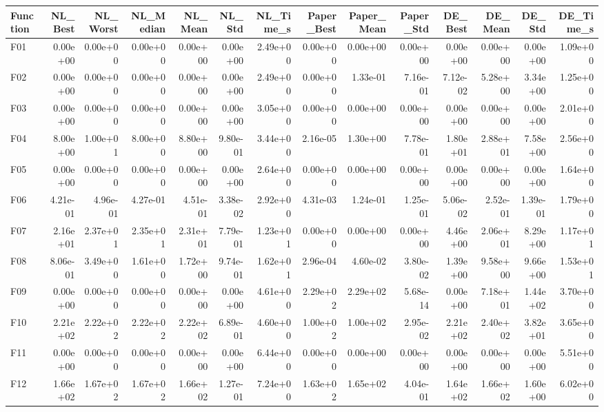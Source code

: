 \begin{tabular}{lrrrrrrrrrrrrr}
\toprule
Function & NL_Best & NL_Worst & NL_Median & NL_Mean & NL_Std & NL_Time_s & Paper_Best & Paper_Mean & Paper_Std & DE_Best & DE_Mean & DE_Std & DE_Time_s \\
\midrule
F01 & 0.00e+00 & 0.00e+00 & 0.00e+00 & 0.00e+00 & 0.00e+00 & 2.49e+00 & 0.00e+00 & 0.00e+00 & 0.00e+00 & 0.00e+00 & 0.00e+00 & 0.00e+00 & 1.09e+00 \\
F02 & 0.00e+00 & 0.00e+00 & 0.00e+00 & 0.00e+00 & 0.00e+00 & 2.49e+00 & 0.00e+00 & 1.33e-01 & 7.16e-01 & 7.12e-02 & 5.28e+00 & 3.34e+00 & 1.25e+00 \\
F03 & 0.00e+00 & 0.00e+00 & 0.00e+00 & 0.00e+00 & 0.00e+00 & 3.05e+00 & 0.00e+00 & 0.00e+00 & 0.00e+00 & 0.00e+00 & 0.00e+00 & 0.00e+00 & 2.01e+00 \\
F04 & 8.00e+00 & 1.00e+01 & 8.00e+00 & 8.80e+00 & 9.80e-01 & 3.44e+00 & 2.16e-05 & 1.30e+00 & 7.78e-01 & 1.80e+01 & 2.88e+01 & 7.58e+00 & 2.56e+00 \\
F05 & 0.00e+00 & 0.00e+00 & 0.00e+00 & 0.00e+00 & 0.00e+00 & 2.64e+00 & 0.00e+00 & 0.00e+00 & 0.00e+00 & 0.00e+00 & 0.00e+00 & 0.00e+00 & 1.64e+00 \\
F06 & 4.21e-01 & 4.96e-01 & 4.27e-01 & 4.51e-01 & 3.38e-02 & 2.92e+00 & 4.31e-03 & 1.24e-01 & 1.25e-01 & 5.06e-02 & 2.52e-01 & 1.39e-01 & 1.79e+00 \\
F07 & 2.16e+01 & 2.37e+01 & 2.35e+01 & 2.31e+01 & 7.79e-01 & 1.23e+01 & 0.00e+00 & 0.00e+00 & 0.00e+00 & 4.46e+00 & 2.06e+01 & 8.29e+00 & 1.17e+01 \\
F08 & 8.06e-01 & 3.49e+00 & 1.61e+00 & 1.72e+00 & 9.74e-01 & 1.62e+01 & 2.96e-04 & 4.60e-02 & 3.80e-02 & 1.39e+00 & 9.58e+00 & 9.66e+00 & 1.53e+01 \\
F09 & 0.00e+00 & 0.00e+00 & 0.00e+00 & 0.00e+00 & 0.00e+00 & 4.61e+00 & 2.29e+02 & 2.29e+02 & 5.68e-14 & 0.00e+00 & 7.18e+01 & 1.44e+02 & 3.70e+00 \\
F10 & 2.21e+02 & 2.22e+02 & 2.22e+02 & 2.22e+02 & 6.89e-01 & 4.60e+00 & 1.00e+02 & 1.00e+02 & 2.95e-02 & 2.21e+02 & 2.40e+02 & 3.82e+01 & 3.65e+00 \\
F11 & 0.00e+00 & 0.00e+00 & 0.00e+00 & 0.00e+00 & 0.00e+00 & 6.44e+00 & 0.00e+00 & 0.00e+00 & 0.00e+00 & 0.00e+00 & 0.00e+00 & 0.00e+00 & 5.51e+00 \\
F12 & 1.66e+02 & 1.67e+02 & 1.67e+02 & 1.66e+02 & 1.27e-01 & 7.24e+00 & 1.63e+02 & 1.65e+02 & 4.04e-01 & 1.64e+02 & 1.66e+02 & 1.60e+00 & 6.02e+00 \\
\bottomrule
\end{tabular}
